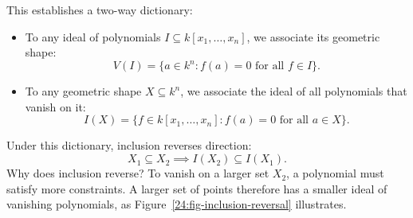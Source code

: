 This establishes a two-way dictionary:
\begin{itemize}
\item To any ideal of polynomials $I \subseteq k[x_1, \dots, x_n]$, we associate its geometric shape:
\[
V(I) = \{a \in k^n : f(a) = 0 \text{ for all } f \in I\}.
\]
\item To any geometric shape $X \subseteq k^n$, we associate the ideal of all polynomials that vanish on it:
\[
I(X) = \{f \in k[x_1, \dots, x_n] : f(a) = 0 \text{ for all } a \in X\}.
\]
\end{itemize}

Under this dictionary, inclusion reverses direction:
\[
X_1 \subseteq X_2 \implies I(X_2) \subseteq I(X_1).
\]
Why does inclusion reverse? To vanish on a larger set $X_2$, a polynomial must satisfy more constraints. A larger set of points therefore has a smaller ideal of vanishing polynomials, as Figure~\ref{24:fig-inclusion-reversal} illustrates.

